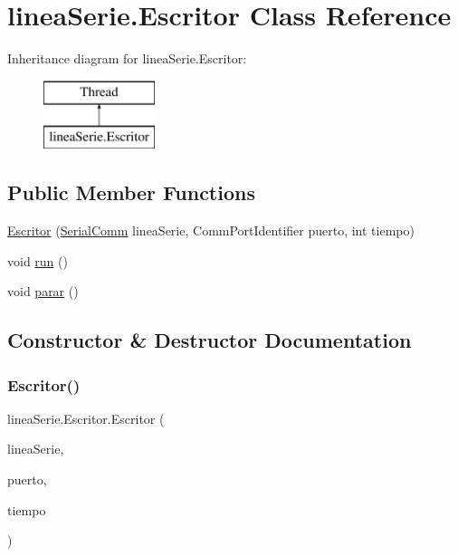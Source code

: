 \hypertarget{classlinea_serie_1_1_escritor}{}\section{linea\+Serie.\+Escritor Class Reference}
\label{classlinea_serie_1_1_escritor}
Inheritance diagram for linea\+Serie.\+Escritor\+:\begin{figure}[H]
\begin{center}
\leavevmode
\includegraphics[height=2.000000cm]{classlinea_serie_1_1_escritor}
\end{center}
\end{figure}
\subsection*{Public Member Functions}
\begin{DoxyCompactItemize}
\item 
\mbox{\hyperlink{classlinea_serie_1_1_escritor_af2862f5412c7f1758e9907d51fb0ca94}{Escritor}} (\mbox{\hyperlink{classlinea_serie_1_1_serial_comm}{Serial\+Comm}} linea\+Serie, Comm\+Port\+Identifier puerto, int tiempo)
\item 
void \mbox{\hyperlink{classlinea_serie_1_1_escritor_acc8b34e63eaf42d3ce0b12f274f50fd3}{run}} ()
\item 
void \mbox{\hyperlink{classlinea_serie_1_1_escritor_a4c82dc2897731863d24462db58f451c7}{parar}} ()
\end{DoxyCompactItemize}


\subsection{Constructor \& Destructor Documentation}
\mbox{\label{classlinea_serie_1_1_escritor_af2862f5412c7f1758e9907d51fb0ca94}} 
\subsubsection{\texorpdfstring{Escritor()}{Escritor()}}
{\footnotesize\ttfamily linea\+Serie.\+Escritor.\+Escritor (\begin{DoxyParamCaption}\item[{\mbox{\hyperlink{classlinea_serie_1_1_serial_comm}{Serial\+Comm}}}]{linea\+Serie,  }\item[{Comm\+Port\+Identifier}]{puerto,  }\item[{int}]{tiempo }\end{DoxyParamCaption})}



